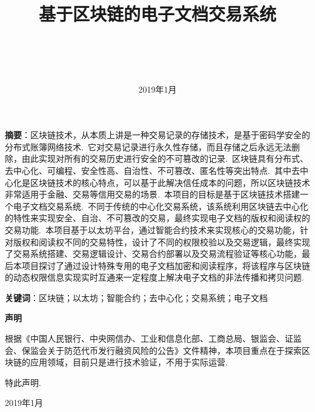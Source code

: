 \documentclass[a4paper,12pt,titlepage]{ctexart}
\title{\begin{LARGE} \textbf{基于区块链的电子文档交易系统} \end{LARGE}\\[2ex]}
\date{2019年1月}
\begin{document}
         
\maketitle
\thispagestyle{plain}
\setcounter{page}{1}
\tableofcontents
\newpage

\pagestyle{empty}
\noindent \textbf{摘要}：区块链技术，从本质上讲是一种交易记录的存储技术，是基于密码学安全的分布式账簿网络技术.~它对交易记录进行永久性存储，而且存储之后永远无法删除，由此实现对所有的交易历史进行安全的不可篡改的记录.~区块链具有分布式、去中心化、可编程、安全性高、自治性、不可篡改、匿名性等突出特点.~其中去中心化是区块链技术的核心特点，可以基于此解决信任成本的问题，所以区块链技术非常适用于金融、交易等信用交易的场景.~本项目的目标是基于区块链技术搭建一个电子文档交易系统.~不同于传统的中心化交易系统，该系统利用区块链去中心化的特性来实现安全、自治、不可篡改的交易，最终实现电子文档的版权和阅读权的交易功能.~本项目基于以太坊平台，通过智能合约技术来实现核心的交易功能，针对版权和阅读权不同的交易特性，设计了不同的权限校验以及交易逻辑，最终实现了交易系统搭建、交易逻辑设计、交易合约部署以及交易流程验证等核心功能，最后本项目探讨了通过设计特殊专用的电子文档加密和阅读程序，将该程序与区块链的动态权限信息实现实时互通来一定程度上解决电子文档的非法传播和拷贝问题.~\\\par
\noindent \textbf{关键词}：区块链；以太坊；智能合约；去中心化；交易系统；电子文档\\\par
\newpage
\begin{center}
\begin{LARGE}
\textbf{声明}
\end{LARGE}
\end{center}\par
根据《中国人民银行、中央网信办、工业和信息化部、工商总局、银监会、证监会、保监会关于防范代币发行融资风险的公告》文件精神，本项目重点在于探索区块链的应用领域，目前只是进行技术验证，不用于实际运营.~\par
特此声明.~\par
\begin{flushright}
2019年1月
\end{flushright}

\newpage
\setcounter{page}{1}
\pagestyle{plain}
\end{document}
